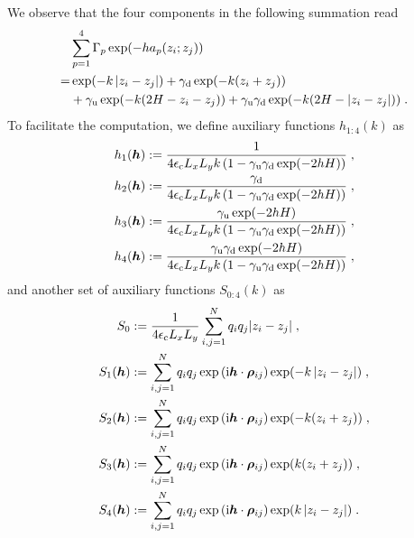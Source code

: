 We observe that the four components in the following summation read
\begin{align*}
     &\sum_{p=1}^4\Gamma_p\exp(-ha_p(z_i;z_j))\\  
     =&\exp(-k\left\lvert z_i-z_j\right\rvert)+\gamma_{\mathrm{d}}\exp(-k(z_i+z_j))\\
     &+\gamma_{\mathrm{u}}\exp(-k(2H-z_i-z_j)) +\gamma_{\mathrm{u}}\gamma_{\mathrm{d}}\exp(-k(2H-\left\lvert z_i-z_j\right\rvert))\;.
\end{align*}
To facilitate the computation, we define auxiliary functions   $h_{1:4}(k)$ as 
\begin{align*}
 h_1(\boldsymbol{h})&:= \frac{1}{4\epsilon_{\mathrm{c}} L_xL_yk\left(1-\gamma_{\mathrm{u}}\gamma_{\mathrm{d}}\exp(-2hH)\right)} \;,\\
  h_2(\boldsymbol{h})&:= \frac{\gamma_{\mathrm{d}}}{4\epsilon_{\mathrm{c}} L_xL_yk\left(1-\gamma_{\mathrm{u}}\gamma_{\mathrm{d}}\exp(-2hH)\right)} \;,\\
   h_3(\boldsymbol{h})&:= \frac{\gamma_{\mathrm{u}}\exp(-2hH)}{4\epsilon_{\mathrm{c}} L_xL_yk\left(1-\gamma_{\mathrm{u}}\gamma_{\mathrm{d}}\exp(-2hH)\right)}\;,\\
     h_4(\boldsymbol{h})&:= \frac{\gamma_{\mathrm{u}}\gamma_{\mathrm{d}}\exp(-2hH)}{4\epsilon_{\mathrm{c}} L_xL_yk\left(1-\gamma_{\mathrm{u}}\gamma_{\mathrm{d}}\exp(-2hH)\right)}\;,
\end{align*}
and another set of auxiliary functions   $S_{0:4}(k)$ as
\begin{align*} 
S_0&:=\frac{1}{4\epsilon_{\mathrm{c}} L_xL_y}\sum_{i,j=1}^Nq_iq_j {\left\lvert z_i-z_j\right\rvert}\;,\\
S_1(\boldsymbol{h})&:=\sum_{i,j=1}^Nq_iq_j  \exp{(\mathrm{i} \boldsymbol{h} \cdot \boldsymbol{\rho}_{ij})}\exp(-k\left\lvert z_i-z_j\right\rvert)\;,\\
S_2(\boldsymbol{h})&:=\sum_{i,j=1}^Nq_iq_j  \exp{(\mathrm{i} \boldsymbol{h} \cdot \boldsymbol{\rho}_{ij})}\exp(-k(z_i+z_j))\;,\\
S_3(\boldsymbol{h})&:=\sum_{i,j=1}^Nq_iq_j  \exp{(\mathrm{i} \boldsymbol{h} \cdot \boldsymbol{\rho}_{ij})}\exp(k(z_i+z_j))\;,\\
S_4(\boldsymbol{h})&:=\sum_{i,j=1}^Nq_iq_j \exp{(\mathrm{i} \boldsymbol{h} \cdot \boldsymbol{\rho}_{ij})}\exp(k\left\lvert z_i-z_j\right\rvert)\;.
\end{align*}
